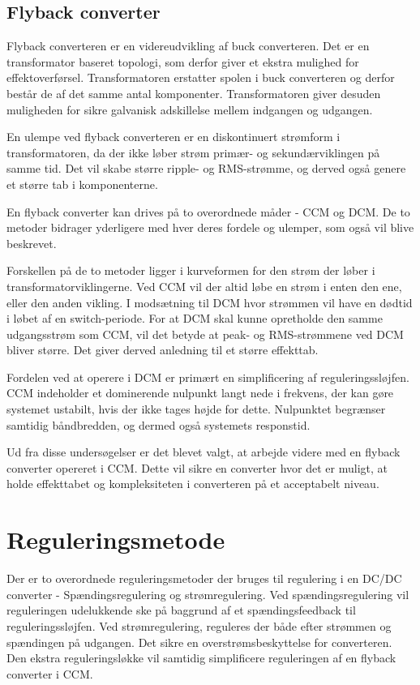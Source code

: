 \subsection{Flyback converter}
Flyback converteren er en videreudvikling af buck converteren. Det er en transformator baseret topologi, som derfor giver et ekstra mulighed for effektoverførsel. Transformatoren erstatter spolen i buck converteren og derfor består de af det samme antal komponenter. Transformatoren giver desuden muligheden for sikre galvanisk adskillelse mellem indgangen og udgangen. 

En ulempe ved flyback converteren er en diskontinuert strømform i transformatoren, da der ikke løber strøm primær- og sekundærviklingen på samme tid. Det vil skabe større ripple- og RMS-strømme, og derved også genere et større tab i komponenterne\cite{SMPS-topologies}. 

En flyback converter kan drives på to overordnede måder - CCM og DCM. De to metoder bidrager yderligere med hver deres fordele og ulemper, som også vil blive beskrevet. 

Forskellen på de to metoder ligger i kurveformen for den strøm der løber i transformatorviklingerne. Ved CCM vil der altid løbe en strøm i enten den ene, eller den anden vikling. I modsætning til DCM hvor strømmen vil have en dødtid i løbet af en switch-periode. For at DCM skal kunne opretholde den samme udgangsstrøm som CCM, vil det betyde at peak- og RMS-strømmene ved DCM bliver større. Det giver derved anledning til et større effekttab. 

Fordelen ved at operere i DCM er primært en simplificering af reguleringssløjfen. CCM indeholder et dominerende nulpunkt langt nede i frekvens, der kan gøre systemet ustabilt, hvis der ikke tages højde for dette. Nulpunktet begrænser samtidig båndbredden, og dermed også systemets responstid. 

Ud fra disse undersøgelser er det blevet valgt, at arbejde videre med en flyback converter opereret i CCM. Dette vil sikre en converter hvor det er muligt, at holde effekttabet og kompleksiteten i converteren på et acceptabelt niveau. 

\section{Reguleringsmetode}
Der er to overordnede reguleringsmetoder der bruges til regulering i en DC/DC converter - Spændingsregulering og strømregulering. Ved spændingsregulering vil reguleringen udelukkende ske på baggrund af et spændingsfeedback til reguleringssløjfen. Ved strømregulering, reguleres der både efter strømmen og spændingen på udgangen. Det sikre en overstrømsbeskyttelse for converteren. Den ekstra reguleringsløkke vil samtidig simplificere reguleringen af en flyback converter i CCM. 

